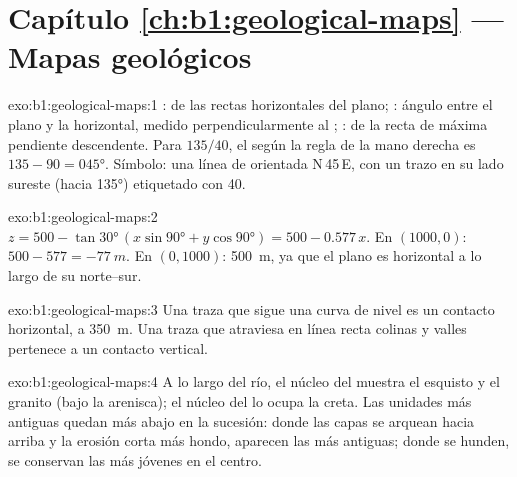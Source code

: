 \section*{Capítulo \ref{ch:b1:geological-maps} --- Mapas geológicos}

\begin{solution}{exo:b1:geological-maps:1}
:  de las rectas horizontales del plano; : ángulo entre el plano y la
horizontal, medido perpendicularmente al ; :  de la recta de
máxima pendiente descendente. Para $135/40$, el  según la regla de la mano derecha es
$135 - 90 = \ang{045}$. Símbolo: una línea de  orientada N\,45\,E, con un trazo en su lado
sureste (hacia \ang{135}) etiquetado con 40.
\end{solution}

\begin{solution}{exo:b1:geological-maps:2}
$z = 500 - \tan\ang{30}\,(x\sin\ang{90} + y\cos\ang{90}) = 500 - 0.577\,x$.
En $(1000, 0)$: $500 - 577 = \qty{-77}{m}$. En $(0, 1000)$: \qty{500}{m}, ya que el plano es
horizontal a lo largo de su  norte--sur.
\end{solution}

\begin{solution}{exo:b1:geological-maps:3}
Una traza que sigue una curva de nivel es un contacto horizontal, a \qty{350}{m}. Una traza que
atraviesa en línea recta colinas y valles pertenece a un contacto vertical.
\end{solution}

\begin{solution}{exo:b1:geological-maps:4}
A lo largo del río, el núcleo del  muestra el esquisto y el granito (bajo la arenisca);
el núcleo del  lo ocupa la creta. Las unidades más antiguas quedan más abajo en la
sucesión: donde las capas se arquean hacia arriba y la erosión corta más hondo, aparecen las más
antiguas; donde se hunden, se conservan las más jóvenes en el centro.
\end{solution}

